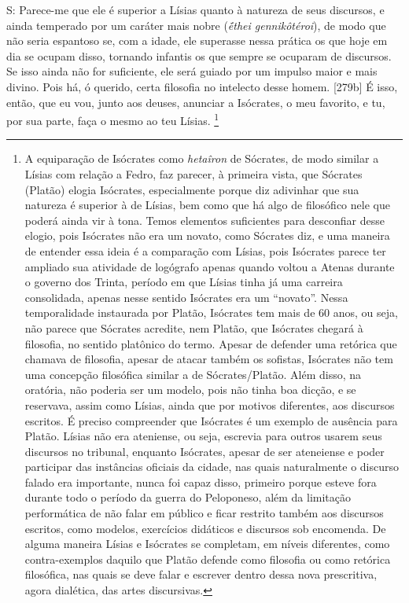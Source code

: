 S: Parece-me que ele é superior a Lísias quanto à natureza de seus
discursos, e ainda temperado por um caráter mais nobre (\emph{ḗthei
gennikôtéroi}), de modo que não seria espantoso se, com a idade, ele
superasse nessa prática os que hoje em dia se ocupam disso, tornando
infantis os que sempre se ocuparam de discursos. Se isso ainda não for
suficiente, ele será guiado por um impulso maior e mais divino. Pois há,
ó querido, certa filosofia no intelecto desse homem. {[}279b{]} É isso,
então, que eu vou, junto aos deuses, anunciar a Isócrates, o meu
favorito, e tu, por sua parte, faça o mesmo ao teu Lísias. \footnote{A
  equiparação de Isócrates como \emph{hetaîron} de Sócrates, de modo
  similar a Lísias com relação a Fedro, faz parecer, à primeira vista,
  que Sócrates (Platão) elogia Isócrates, especialmente porque diz
  adivinhar que sua natureza é superior à de Lísias, bem como que há
  algo de filosófico nele que poderá ainda vir à tona. Temos elementos
  suficientes para desconfiar desse elogio, pois Isócrates não era um
  novato, como Sócrates diz, e uma maneira de entender essa ideia é a
  comparação com Lísias, pois Isócrates parece ter ampliado sua
  atividade de logógrafo apenas quando voltou a Atenas durante o governo
  dos Trinta, período em que Lísias tinha já uma carreira consolidada,
  apenas nesse sentido Isócrates era um ``novato''. Nessa temporalidade
  instaurada por Platão, Isócrates tem mais de 60 anos, ou seja, não
  parece que Sócrates acredite, nem Platão, que Isócrates chegará à
  filosofia, no sentido platônico do termo. Apesar de defender uma
  retórica que chamava de filosofia, apesar de atacar também os
  sofistas, Isócrates não tem uma concepção filosófica similar a de
  Sócrates/Platão. Além disso, na oratória, não poderia ser um modelo,
  pois não tinha boa dicção, e se reservava, assim como Lísias, ainda
  que por motivos diferentes, aos discursos escritos. É preciso
  compreender que Isócrates é um exemplo de ausência para Platão. Lísias
  não era ateniense, ou seja, escrevia para outros usarem seus discursos
  no tribunal, enquanto Isócrates, apesar de ser ateneiense e poder
  participar das instâncias oficiais da cidade, nas quais naturalmente o
  discurso falado era importante, nunca foi capaz disso, primeiro porque
  esteve fora durante todo o período da guerra do Peloponeso, além da
  limitação performática de não falar em público e ficar restrito também
  aos discursos escritos, como modelos, exercícios didáticos e discursos
  sob encomenda. De alguma maneira Lísias e Isócrates se completam, em
  níveis diferentes, como contra-exemplos daquilo que Platão defende
  como filosofia ou como retórica filosófica, nas quais se deve falar e
  escrever dentro dessa nova prescritiva, agora dialética, das artes
  discursivas.}

